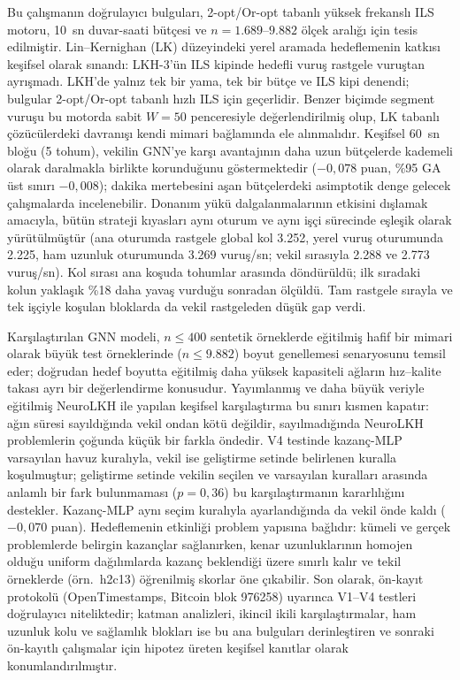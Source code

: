 \documentclass[pdflatex,sn-basic]{sn-jnl}
\begin{document}
Bu çalışmanın doğrulayıcı bulguları, 2-opt/Or-opt tabanlı yüksek frekanslı ILS motoru, 10~sn
duvar-saati bütçesi ve $n=1.689$--$9.882$ ölçek aralığı için tesis edilmiştir.
Lin--Kernighan (LK) düzeyindeki yerel aramada hedeflemenin katkısı keşifsel olarak sınandı:
LKH-3'ün ILS kipinde hedefli vuruş rastgele vuruştan ayrışmadı. LKH'de yalnız tek bir yama, tek
bir bütçe ve ILS kipi denendi; bulgular 2-opt/Or-opt tabanlı hızlı ILS için geçerlidir.
Benzer biçimde segment vuruşu bu motorda sabit $W=50$ penceresiyle değerlendirilmiş olup, LK
tabanlı çözücülerdeki davranışı kendi mimari bağlamında ele alınmalıdır.
Keşifsel 60~sn bloğu (5 tohum), vekilin GNN'ye karşı avantajının daha uzun bütçelerde kademeli
olarak daralmakla birlikte korunduğunu göstermektedir ($-0{,}078$ puan, \%95 GA üst sınırı
$-0{,}008$); dakika mertebesini aşan bütçelerdeki asimptotik denge gelecek çalışmalarda
incelenebilir.
Donanım yükü dalgalanmalarının etkisini dışlamak amacıyla, bütün strateji kıyasları aynı oturum ve
aynı işçi sürecinde eşleşik olarak yürütülmüştür (ana oturumda rastgele global kol 3.252, yerel
vuruş oturumunda 2.225, ham uzunluk oturumunda 3.269 vuruş/sn; vekil sırasıyla 2.288 ve
2.773 vuruş/sn).
Kol sırası ana koşuda tohumlar arasında döndürüldü; ilk sıradaki kolun yaklaşık \%18 daha yavaş
vurduğu sonradan ölçüldü. Tam rastgele sırayla ve tek işçiyle koşulan bloklarda da vekil rastgeleden
düşük gap verdi.

Karşılaştırılan GNN modeli, $n\le400$ sentetik örneklerde eğitilmiş hafif bir mimari olarak büyük
test örneklerinde ($n\le9.882$) boyut genellemesi senaryosunu temsil eder; doğrudan hedef boyutta
eğitilmiş daha yüksek kapasiteli ağların hız--kalite takası ayrı bir değerlendirme konusudur.
Yayımlanmış ve daha büyük veriyle eğitilmiş NeuroLKH ile yapılan keşifsel karşılaştırma bu sınırı
kısmen kapatır: ağın süresi sayıldığında vekil ondan kötü değildir, sayılmadığında NeuroLKH
problemlerin çoğunda küçük bir farkla öndedir.
V4 testinde kazanç-MLP varsayılan havuz kuralıyla, vekil ise geliştirme setinde belirlenen kuralla
koşulmuştur; geliştirme setinde vekilin seçilen ve varsayılan kuralları arasında anlamlı bir fark
bulunmaması ($p=0{,}36$) bu karşılaştırmanın kararlılığını destekler. Kazanç-MLP aynı seçim
kuralıyla ayarlandığında da vekil önde kaldı ($-0{,}070$ puan).
Hedeflemenin etkinliği problem yapısına bağlıdır: kümeli ve gerçek problemlerde belirgin kazançlar
sağlanırken, kenar uzunluklarının homojen olduğu uniform dağılımlarda kazanç beklendiği üzere
sınırlı kalır ve tekil örneklerde (örn.\ h2c13) öğrenilmiş skorlar öne çıkabilir.
Son olarak, ön-kayıt protokolü (OpenTimestamps, Bitcoin blok 976258) uyarınca V1--V4 testleri
doğrulayıcı niteliktedir; katman analizleri, ikincil ikili karşılaştırmalar, ham uzunluk kolu ve
sağlamlık blokları ise bu ana bulguları derinleştiren ve sonraki ön-kayıtlı çalışmalar için
hipotez üreten keşifsel kanıtlar olarak konumlandırılmıştır.
\end{document}
